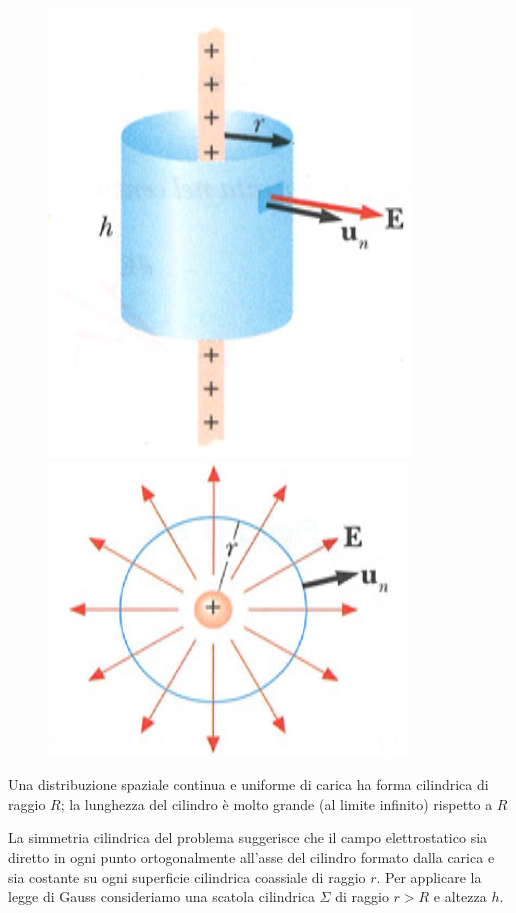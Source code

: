 \documentclass[class=book, crop=false, oneside, 12pt]{standalone}
\begin{document}
\begin{figure}[h]
    \includegraphics[scale=0.4]{campo_cilindro.png}
    \includegraphics[scale=0.4]{campo_cilindro_sezione.png}
    \centering
    \caption{}
\end{figure}
Una distribuzione spaziale continua e uniforme di carica ha forma cilindrica di raggio \(R\); la lunghezza del cilindro è molto grande (al limite infinito) rispetto a \(R\) 

La simmetria cilindrica del problema suggerisce che il campo elettrostatico sia diretto in ogni punto ortogonalmente all'asse del cilindro formato dalla carica e sia costante su ogni superficie cilindrica coassiale di raggio \(r\).
Per applicare la legge di Gauss consideriamo una scatola cilindrica \(\Sigma\) di raggio \(r > R\) e altezza \(h\).
\end{document}
